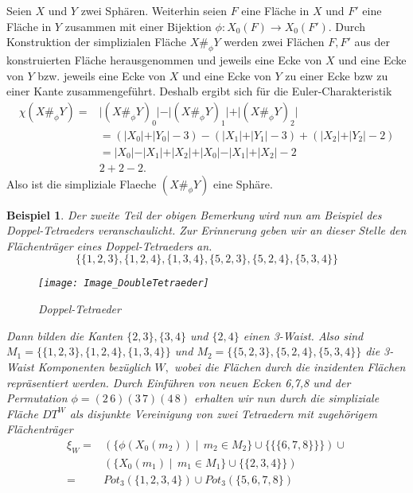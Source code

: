 \documentclass[12pt,titlepage,twoside,cleardoublepage]{article}
\theoremstyle{nummermitklammern}
\newtheorem{bsp}[temp]{Beispiel}
\newtheorem{bsp}[zahl]{Beispiel}
\numberwithin{equation}{section}
\begin{document}
Seien $X$ und $Y$ zwei Sphären. Weiterhin seien  $F$ eine Fläche in $X$ und $F'$ eine Fläche in $Y$ zusammen mit einer Bijektion $\phi :X_0(F)\to X_0(F').$ Durch Konstruktion der simplizialen Fläche $X\#_\phi Y$ werden zwei Flächen $F,F'$ aus der konstruierten Fläche herausgenommen und jeweils eine Ecke von $X$ und eine Ecke von $Y$ bzw. jeweils eine Ecke von $X$ und eine Ecke von $Y$ zu einer Ecke bzw zu einer Kante zusammengeführt. Deshalb ergibt sich für die Euler-Charakteristik
\begin{align*}
\chi(X\#_\phi Y)=&\vert(X\#_\phi Y)_0\vert -\vert (X\#_\phi Y)_1\vert +\vert (X\#_\phi Y)_2\vert\\
&=(\vert X_0\vert+\vert Y_0\vert-3)-(\vert X_1\vert+\vert Y_1\vert-3)+(\vert X_2\vert+\vert Y_2\vert-2)\\ 
&=\vert X_0\vert-\vert X_1\vert+\vert X_2\vert+\vert X_0\vert-\vert X_1\vert+\vert X_2\vert-2\\
&2+2-2.
\end{align*}
Also ist die simpliziale Flaeche $(X\#_\phi Y)$ eine Sphäre. 
\begin{bsp}
Der zweite Teil der obigen Bemerkung wird nun am Beispiel des Doppel-Tetraeders veranschaulicht.
Zur Erinnerung geben wir an dieser Stelle den Flächenträger eines Doppel-Tetraeders an.
\[
\{\{1,2,3\},\{1,2,4\},\{1,3,4\},\{5,2,3\},\{5,2,4\},\{5,3,4\}\}
\]
\begin{figure}[H]
\begin{center}
\texttt{[image: Image\_DoubleTetraeder]}
\end{center}
\caption{Doppel-Tetraeder}
\end{figure}
Dann bilden die Kanten $\{2,3\},\{3,4\}$ und $\{2,4\}$ einen 3-Waist. Also sind $M_1=\{\{1,2,3\},\{1,2,4\},\{1,3,4\}\}$ und $M_2=\{\{5,2,3\},\{5,2,4\},\{5,3,4\}\}$ die 3-Waist Komponenten bezüglich $W,$ wobei die Flächen durch die inzidenten Flächen repräsentiert werden. Durch Einführen von neuen Ecken 6,7,8 und der Permutation $\phi=(2\, 6)(3\, 7)(4\,8)$ erhalten wir nun durch die simpliziale Fläche $DT^W$ als disjunkte Vereinigung von zwei Tetraedern mit zugehörigem Flächenträger
\begin{align*}
\xi_W=&(\{\phi(X_0(m_2))\mid \, m_2\in M_2\}\cup \{\{\{6,7,8\}\}\}) \cup \\
&(\{X_0(m_1)\mid \, m_1\in M_1\}\cup \{\{2,3,4\}\})\\
=&Pot_3(\{1,2,3,4\})\cup Pot_3(\{5,6,7,8\})
\end{align*}
\end{bsp}
\end{document}
